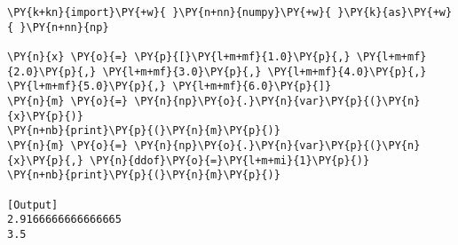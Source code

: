 \begin{Verbatim}[label=\makebox{\href{https://github.com/unipi-physics-labs/lab1-notes/tree/main/snippy/np.var.py}{https://github.com/.../np.var.py}},commandchars=\\\{\}]
\PY{k+kn}{import}\PY{+w}{ }\PY{n+nn}{numpy}\PY{+w}{ }\PY{k}{as}\PY{+w}{ }\PY{n+nn}{np}

\PY{n}{x} \PY{o}{=} \PY{p}{[}\PY{l+m+mf}{1.0}\PY{p}{,} \PY{l+m+mf}{2.0}\PY{p}{,} \PY{l+m+mf}{3.0}\PY{p}{,} \PY{l+m+mf}{4.0}\PY{p}{,} \PY{l+m+mf}{5.0}\PY{p}{,} \PY{l+m+mf}{6.0}\PY{p}{]}
\PY{n}{m} \PY{o}{=} \PY{n}{np}\PY{o}{.}\PY{n}{var}\PY{p}{(}\PY{n}{x}\PY{p}{)}
\PY{n+nb}{print}\PY{p}{(}\PY{n}{m}\PY{p}{)}
\PY{n}{m} \PY{o}{=} \PY{n}{np}\PY{o}{.}\PY{n}{var}\PY{p}{(}\PY{n}{x}\PY{p}{,} \PY{n}{ddof}\PY{o}{=}\PY{l+m+mi}{1}\PY{p}{)}
\PY{n+nb}{print}\PY{p}{(}\PY{n}{m}\PY{p}{)}

[Output]
2.9166666666666665
3.5
\end{Verbatim}
